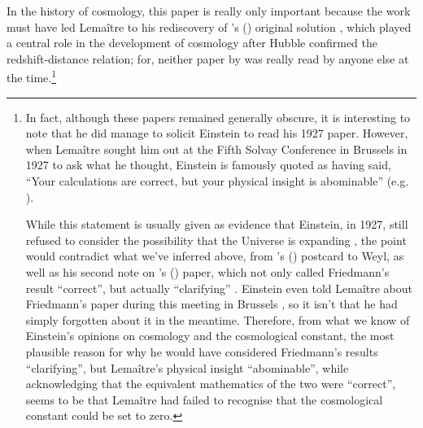 \documentclass[12 pt]{article}
\def\citeapos#1{\citeauthor{#1}'s (\citeyear{#1})}
\begin{document}
In the history of cosmology, this paper is really only important because the work must have led Lema\^{i}tre to his rediscovery of \citeapos{Friedmann1922} original solution \citep{Lemaitre1927}, which played a central role in the development of cosmology after Hubble confirmed the redshift-distance relation; for, neither paper by \citet{Lemaitre1925,Lemaitre1927} was really read by anyone else at the time.\footnote{In fact, although these papers remained generally obscure, it is interesting to note that he did manage to solicit Einstein to read his 1927 paper. However, when Lema\^{i}tre sought him out at the Fifth Solvay Conference in Brussels in 1927 to ask what he thought, Einstein is famously quoted as having said, ``Your calculations are correct, but your physical insight is abominable'' (e.g. \citealt{Smith1990}). 

While this statement is usually given as evidence that Einstein, in 1927, still refused to consider the possibility that the Universe is expanding \citep{Smith1990,Kragh2003,Farrell2005,Bartusiak2009}, the point would contradict what we've inferred above, from \citeapos{Einstein1923b} postcard to Weyl, as well as his second note on \citeapos{Friedmann1922} paper, which not only called Friedmann's result ``correct'', but actually ``clarifying'' \citep{Einstein1923a}. Einstein even told Lema\^{i}tre about Friedmann's paper during this meeting in Brussels \citep{Kragh2003,Farrell2005,Bartusiak2009}, so it isn't that he had simply forgotten about it in the meantime. Therefore, from what we know of Einstein's opinions on cosmology and the cosmological constant, the most plausible reason for why he would have considered Friedmann's results ``clarifying'', but Lema\^{i}tre's physical insight ``abominable'', while acknowledging that the equivalent mathematics of the two were ``correct'', seems to be that Lema\^{i}tre had failed to recognise that the cosmological constant could be set to zero. 

}
\end{document}
